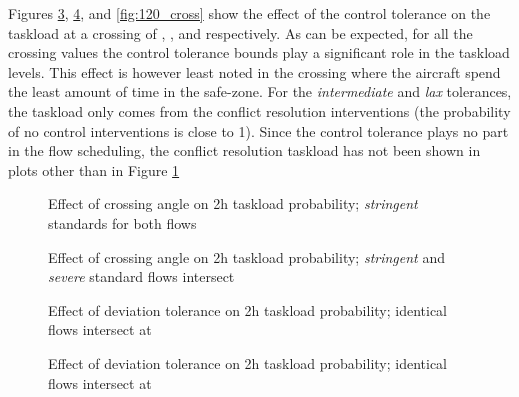 \documentclass[conference]{IEEEtran}
\begin{document}
Figures \ref{fig:30_cross}, \ref{fig:90_cross}, and \ref{fig:120_cross} show the effect of the control tolerance on the taskload at a crossing of , , and  respectively. As can be expected, for all the crossing values the control tolerance bounds play a significant role in the taskload levels. This effect is however least noted in the  crossing where the aircraft spend the least amount of time in the safe-zone. For the \emph{intermediate} and \emph{lax} tolerances, the taskload only comes from the conflict resolution interventions (the probability of no control interventions is close to 1). Since the control tolerance plays no part in the flow scheduling, the conflict resolution taskload has not been shown in plots other than in Figure \ref{fig:stringent_cross} 

\begin{figure}[!h]
\centering
{}
\caption{Effect of crossing angle on 2h taskload probability; \emph{stringent} standards for both flows }
\label{fig:stringent_cross}
\end{figure}

\begin{figure}[!h]
\centering
{}
\caption{Effect of crossing angle on 2h taskload probability; \emph{stringent} and \emph{severe} standard flows intersect}
\label{fig:stringent_severe_cross}
\end{figure}


\begin{figure}[!h]
\centering
{}
\caption{Effect of deviation tolerance on 2h taskload probability; identical flows intersect at }
\label{fig:30_cross}
\end{figure}


\begin{figure}[!h]
\centering
{}
\caption{Effect of deviation tolerance on 2h taskload probability; identical flows intersect at }
\label{fig:90_cross}
\end{figure}
\end{document}
